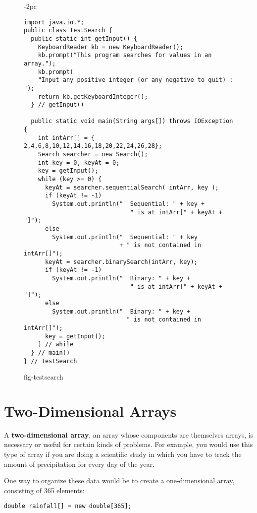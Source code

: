 \begin{figure}[thb]
\jjjprogstart
\begin{jjjlistingleft}[28pc]{-2pc}
\begin{lstlisting}
import java.io.*;
public class TestSearch {
  public static int getInput() {
    KeyboardReader kb = new KeyboardReader();
    kb.prompt("This program searches for values in an array.");
    kb.prompt(
    "Input any positive integer (or any negative to quit) : ");
    return kb.getKeyboardInteger();
  } // getInput()

  public static void main(String args[]) throws IOException {
    int intArr[] = { 2,4,6,8,10,12,14,16,18,20,22,24,26,28};
    Search searcher = new Search();
    int key = 0, keyAt = 0;
    key = getInput();
    while (key >= 0) {
      keyAt = searcher.sequentialSearch( intArr, key );
      if (keyAt != -1)
        System.out.println("  Sequential: " + key + 
                              " is at intArr[" + keyAt + "]");
      else
        System.out.println("  Sequential: " + key 
                           + " is not contained in intArr[]");
      keyAt = searcher.binarySearch(intArr, key);
      if (keyAt != -1)
        System.out.println("  Binary: " + key + 
                              " is at intArr[" + keyAt + "]");
      else
        System.out.println("  Binary: " + key + 
                             " is not contained in intArr[]");
      key = getInput();
    } // while
  } // main()
} // TestSearch
\end{lstlisting}
\end{jjjlistingleft}
{fig-testsearch}
\end{figure}


\section{Two-Dimensional Arrays}
\noindent A {\bf two-dimensional array}, an array whose components are
themselves arrays, is necessary or useful for certain kinds of
problems.  For example, you would use this type of array if you are
doing a scientific study in which you have to track the amount of
precipitation for every day of the year.

One way to organize these data would be to create a one-dimensional
array, consisting of 365 elements:

\begin{jjjlisting}
\begin{lstlisting}
double rainfall[] = new double[365];
\end{lstlisting}
\end{jjjlisting}

